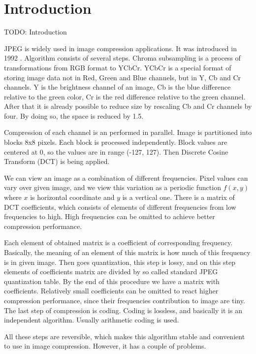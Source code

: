 \chapter{Introduction}

TODO: Introduction

JPEG is widely used in image compression applications. It was introduced in 1992 \cite{wallace_jpeg_1992}. Algorithm consists of several steps. Chroma subsampling is a process of transformations from RGB format to YCbCr. YCbCr is a special format of storing image data not in Red, Green and Blue channels, but in Y, Cb and Cr channels. Y is the brightness channel of an image, Cb is the blue difference relative to the green color, Cr is the red difference relative to the green channel. After that it is already possible to reduce size by rescaling Cb and Cr channels by four. By doing so, the space is reduced by 1.5.

Compression of each channel is an performed in parallel. Image is partitioned into blocks 8x8 pixels. Each block is processed independently. Block values are centered at 0, so the values are in range (-127, 127). Then Discrete Cosine Transform (DCT) is being applied.

We can view an image as a combination of different frequencies. Pixel values can vary over given image, and we view this variation as a periodic function $f(x, y)$ where $x$ is horizontal coordinate and $y$ is a vertical one. There is a matrix of DCT coefficients, which consists of elements of different frequencies from low frequencies to high. High frequencies can be omitted to achieve better compression performance.

Each element of obtained matrix is a coefficient of corresponding frequency. Basically, the meaning of an element of this matrix is how much of this frequency is in given image. Then goes quantization, this step is lossy, and on this step elements of coefficients matrix are divided by so called standard JPEG quantization table. By the end of this procedure we have a matrix with coefficients. Relatively small coefficients can be omitted to react higher compression performance, since their frequencies contribution to image are tiny. The last step of compression is coding. Coding is lossless, and basically it is an independent algorithm. Usually arithmetic coding is used.

All these steps are reversible, which makes this algorithm stable and convenient to use in image compression. However, it has a couple of problems.

